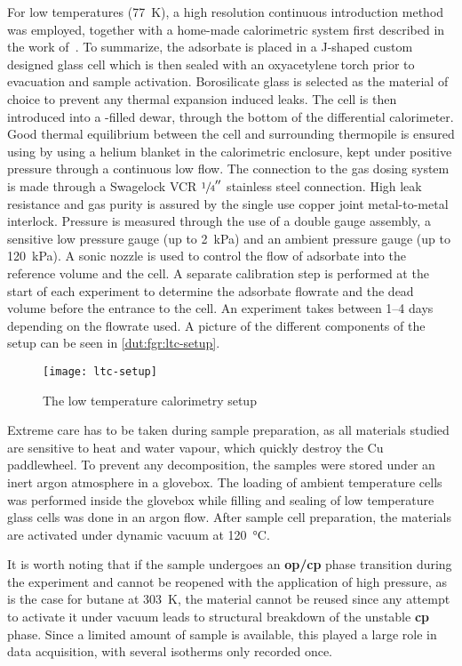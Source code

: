For low temperatures (\SI{77}{\kelvin}), a high resolution continuous
introduction method was employed, together with a home-made 
calorimetric system first described in the work 
of~\citet{rouquerolCalorimetricEvidenceBidimensional1977}. To summarize,
the adsorbate is placed in a J-shaped custom designed glass cell which is
then sealed with an oxyacetylene torch prior to evacuation and sample 
activation. Borosilicate glass is selected as
the material of choice to prevent any thermal expansion induced leaks.
The cell is then introduced into a -filled dewar, through 
the bottom of the differential calorimeter. Good thermal equilibrium
between the cell and surrounding thermopile is ensured using by 
using a helium blanket in the calorimetric enclosure, kept under 
positive pressure through a continuous low flow. The connection to the 
gas dosing system is made through a Swagelock VCR \(\sfrac{1}{4}''\)
stainless steel connection. High leak resistance and gas purity 
is assured by the single use copper joint metal-to-metal interlock.
Pressure is measured through the use of a double gauge assembly,
a sensitive low pressure gauge (up to \SI{2}{\kilo\pascal}) and 
an ambient pressure gauge (up to \SI{120}{\kilo\pascal}).
A sonic nozzle is used to control the flow of adsorbate into the 
reference volume and the cell. A separate calibration step is 
performed at the start of each experiment to determine the adsorbate
flowrate and the dead volume before the entrance to the cell.
An experiment takes between 1--4 days depending 
on the flowrate used. A picture of the different components of the 
setup can be seen in \autoref{dut:fgr:ltc-setup}.

\begin{figure}[htb]
    \centering
    \texttt{[image: ltc-setup]}%
    \caption{The low temperature calorimetry setup}%
    \label{dut:fgr:ltc-setup}
\end{figure}

Extreme care has to be taken during sample preparation, as all materials 
studied are sensitive to heat and water vapour, which quickly 
destroy the Cu paddlewheel. To prevent any 
decomposition, the samples were stored under an inert argon 
atmosphere in a glovebox. The loading of ambient temperature 
cells was performed inside the glovebox while filling and sealing 
of low temperature glass cells was done in an argon flow. After 
sample cell preparation, the materials are activated under 
dynamic vacuum at \SI{120}{\degreeCelsius}. 

It is worth noting that if the sample undergoes an \textbf{op/cp}
phase transition during the experiment and cannot be reopened with
the application of high pressure, as is the case for butane at 
\SI{303}{\kelvin}, the material cannot be reused since any attempt to
activate it under vacuum leads to structural breakdown of the 
unstable \textbf{cp} phase. 
Since a limited amount of sample is available, this played a large
role in data acquisition, with several isotherms only recorded once.
